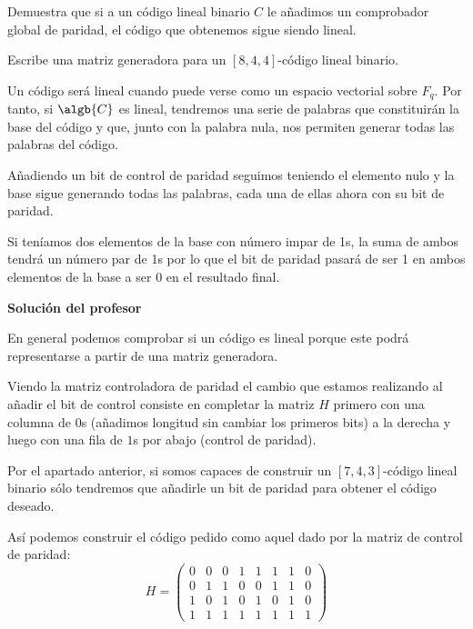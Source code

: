 \begin{problem}[13]\label{ej:Hamming_extendido}
\ppart Demuestra que si a un código lineal binario $C$
le añadimos un comprobador global de paridad, el código que
obtenemos sigue siendo lineal.

\ppart Escribe una matriz generadora para un $[8,4,4]$-código lineal
binario.

\solution

\spart


Un código será lineal cuando puede verse como un espacio vectorial sobre $F_q$. Por tanto, si $\algb{C}$ es lineal, tendremos una serie de palabras que constituirán la base del código y que, junto con la palabra nula, nos permiten generar todas las palabras del código.

Añadiendo un bit de control de paridad seguimos teniendo el elemento nulo y la base sigue generando todas las palabras, cada una de ellas ahora con su bit de paridad.

Si teníamos dos elementos de la base con número impar de 1s, la suma de ambos tendrá un número par de 1s por lo que el bit de paridad pasará de ser 1 en ambos elementos de la base a ser 0 en el resultado final.

\textbf{Solución del profesor}

En general podemos comprobar si un código es lineal porque este podrá representarse a partir de una matriz generadora.

Viendo la matriz controladora de paridad el cambio que estamos realizando al añadir el bit de control consiste en completar la matriz $H$ primero con una columna de $0$s (añadimos longitud sin cambiar los primeros bits) a la derecha y luego con una fila de $1$s por abajo (control de paridad).

\spart

Por el apartado anterior, si somos capaces de construir un $[7,4,3]$-código lineal binario sólo tendremos que añadirle un bit de paridad para obtener el código deseado.

Así podemos construir el código pedido como aquel dado por la matriz de control de paridad:
\[H = \left( \begin{array}{ccccccc|c}
0 & 0 & 0 & 1 & 1 & 1 & 1 & 0 \\
0 & 1 & 1 & 0 & 0 & 1 & 1 & 0 \\
1 & 0 & 1 & 0 & 1 & 0 & 1 & 0 \\
\hline
1 & 1 & 1 & 1 & 1 & 1 & 1 & 1
\end{array}\right)\]

\end{problem}

